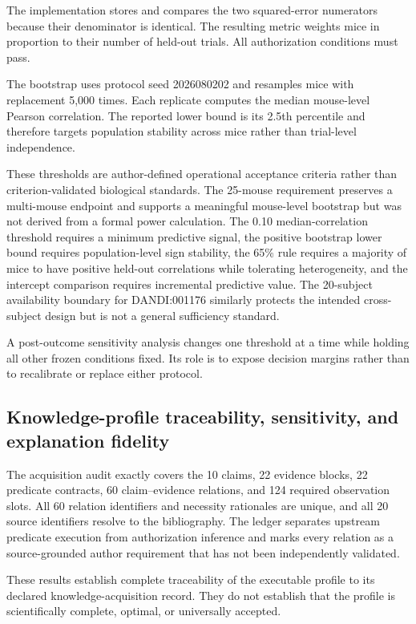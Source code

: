 \documentclass[11pt,a4paper]{article}
\begin{document}
The implementation stores and compares the two squared-error numerators
because their denominator is identical. The resulting metric weights mice in
proportion to their number of held-out trials. All authorization conditions
must pass.

The bootstrap uses protocol seed 2026080202 and resamples mice with
replacement 5,000 times. Each replicate computes the median mouse-level
Pearson correlation. The reported lower bound is its 2.5th percentile and
therefore targets population stability across mice rather than trial-level
independence.

These thresholds are author-defined operational acceptance criteria rather
than criterion-validated biological standards. The 25-mouse requirement
preserves a multi-mouse endpoint and supports a meaningful mouse-level
bootstrap but was not derived from a formal power calculation. The 0.10
median-correlation threshold requires a minimum predictive signal, the
positive bootstrap lower bound requires population-level sign stability, the
65\% rule requires a majority of mice to have positive held-out correlations
while tolerating heterogeneity, and the intercept comparison requires
incremental predictive value. The 20-subject availability boundary for
DANDI:001176 similarly protects the intended cross-subject design but is not
a general sufficiency standard.

A post-outcome sensitivity analysis changes one threshold at a time while
holding all other frozen conditions fixed. Its role is to expose decision
margins rather than to recalibrate or replace either protocol.


\subsection{Knowledge-profile traceability, sensitivity, and explanation fidelity}
\label{subsec:construct-validity-results}

The acquisition audit exactly covers the 10 claims, 22 evidence blocks, 22
predicate contracts, 60 claim--evidence relations, and 124 required
observation slots. All 60 relation identifiers and necessity rationales are
unique, and all 20 source identifiers resolve to the bibliography. The ledger
separates upstream predicate execution from authorization inference and marks
every relation as a source-grounded author requirement that has not been
independently validated.

These results establish complete traceability of the executable profile to its
declared knowledge-acquisition record. They do not establish that the profile
is scientifically complete, optimal, or universally accepted.
\end{document}

